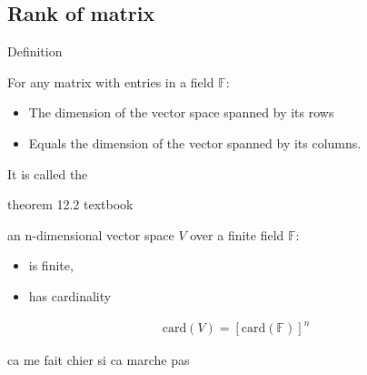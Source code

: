 \subsection{Rank of matrix}
\begin{parag}{Definition}
   \begin{definition}
    For any matrix with entries in a field $\mathbb{F}$:
    \begin{itemize}
    \item The dimension of the vector space spanned by its rows
    \item  Equals the dimension of the vector spanned by its columns.
    \end{itemize}
    It is called the 
   \end{definition} 
\end{parag}

\begin{parag}{theorem 12.2 textbook}
    \begin{theoreme}
    an n-dimensional vector space $V$ over a finite field $\mathbb{F}$:
    \begin{itemize}
        \item is finite,
        \item has cardinality
    \end{itemize}

    
    \begin{align*} \text{card}\left(V\right) =  \left[\text{card}\left(\mathbb{F}\right)\right]^n \end{align*}
    \end{theoreme}
\end{parag}




ca me fait chier si ca marche pas




